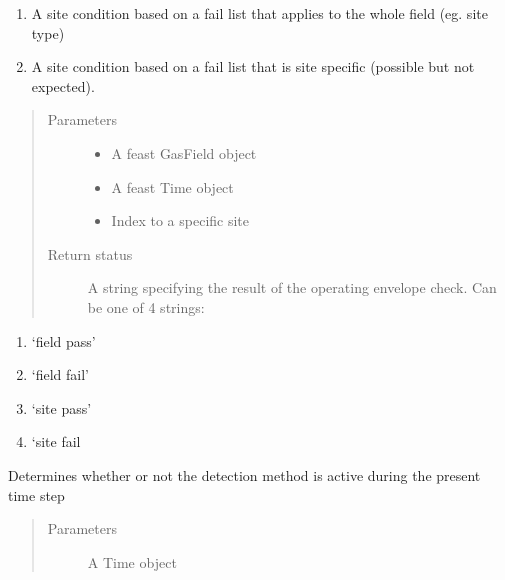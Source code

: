 \documentclass[letterpaper,10pt,english]{sphinxmanual}
\begin{document}
\begin{fulllineitems}
\begin{fulllineitems}
\begin{enumerate}
\item {} 
A site condition based on a fail list that applies to the whole field (eg. site type)

\item {} 
A site condition based on a fail list that is site specific (possible but not expected).

\end{enumerate}
\begin{quote}\begin{description}
\item[{Parameters}] \leavevmode\begin{itemize}
\item {} 
 \textendash{} A feast GasField object

\item {} 
 \textendash{} A feast Time object

\item {} 
 \textendash{} Index to a specific site

\end{itemize}

\item[{Return status}] \leavevmode
A string specifying the result of the operating envelope check. Can be one of 4 strings:

\end{description}\end{quote}
\begin{enumerate}
%
\item {} 
‘field pass’

\item {} 
‘field fail’

\item {} 
‘site pass’

\item {} 
‘site fail

\end{enumerate}

\end{fulllineitems}


\begin{fulllineitems}
\label{\detokenize{index:feast.DetectionModules.abstract_detection_method.DetectionMethod.check_time}}
Determines whether or not the detection method is active during the present time step
\begin{quote}\begin{description}
\item[{Parameters}] \leavevmode
{} \textendash{} A Time object


\end{description}
\end{quote}
\end{fulllineitems}
\end{fulllineitems}
\end{document}
